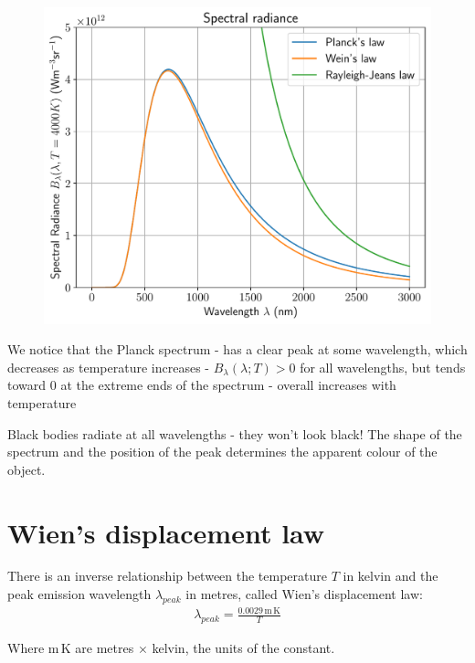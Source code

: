 \documentclass[
  letterpaper,
  DIV=11,
  numbers=noendperiod]{scrreprt}
\begin{document}
\begin{figure}[H]

{\centering \includegraphics{SP1.1_-_Stellar_Properties_files/figure-pdf/cell-21-output-1.pdf}

}

\end{figure}

We notice that the Planck spectrum - has a clear peak at some
wavelength, which decreases as temperature increases -
\(B_\lambda(\lambda;T)> 0\) for all wavelengths, but tends toward \(0\)
at the extreme ends of the spectrum - overall increases with temperature

Black bodies radiate at all wavelengths - they won't look black! The
shape of the spectrum and the position of the peak determines the
apparent colour of the object.

\hypertarget{wiens-displacement-law}{%
\section{Wien's displacement law}\label{wiens-displacement-law}}

There is an inverse relationship between the temperature \(T\) in kelvin
and the peak emission wavelength \(\lambda_{peak}\) in metres, called
Wien's displacement law: \begin{align}
\lambda_{peak} = \frac{0.0029\,\mathrm{m\,K}}{T}
\end{align}

Where \(\mathrm{m\,K}\) are metres \(\times\) kelvin, the units of the
constant.
\end{document}

